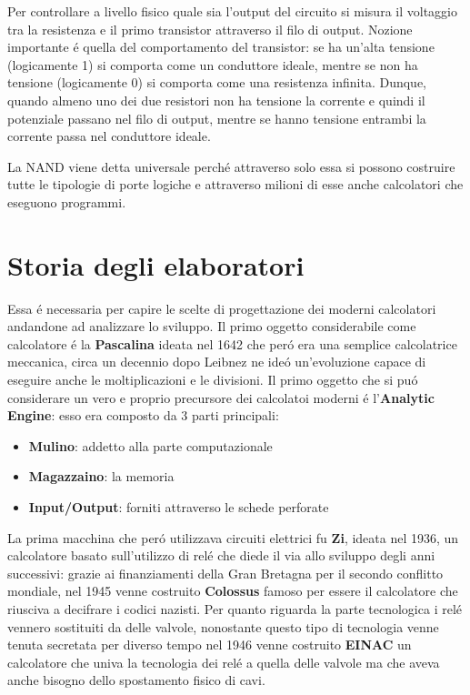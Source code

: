 \documentclass{article}
\begin{document}
Per controllare a livello fisico quale sia l'output del circuito si misura il voltaggio tra la resistenza e il primo transistor attraverso il filo di output. Nozione importante é quella del comportamento del transistor: se ha un'alta tensione (logicamente 1) si comporta come un conduttore ideale, mentre se non ha tensione (logicamente 0) si comporta come una resistenza infinita. Dunque, quando almeno uno dei due resistori non ha tensione la corrente e quindi il potenziale passano nel filo di output, mentre se hanno tensione entrambi la corrente passa nel conduttore ideale.


La NAND viene detta universale perché attraverso solo essa si possono costruire tutte le tipologie di porte logiche e attraverso milioni di esse anche calcolatori che eseguono programmi.


\section{Storia degli elaboratori}
Essa é necessaria per capire le scelte di progettazione dei moderni calcolatori andandone ad analizzare lo sviluppo. Il primo oggetto considerabile come calcolatore é la \textbf{Pascalina} ideata nel 1642 che peró era una semplice calcolatrice meccanica, circa un decennio dopo Leibnez ne ideó un'evoluzione capace di eseguire anche le moltiplicazioni e le divisioni. Il primo oggetto che si puó considerare un vero e proprio precursore dei calcolatoi moderni é l'\textbf{Analytic Engine}: esso era composto da 3 parti principali:
\begin{itemize}
    \item \textbf{Mulino}: addetto alla parte computazionale
    \item \textbf{Magazzaino}: la memoria
    \item \textbf{Input/Output}: forniti attraverso le schede perforate
\end{itemize}
La prima macchina che peró utilizzava circuiti elettrici fu \textbf{Zi}, ideata nel 1936, un calcolatore basato sull'utilizzo di relé che diede il via allo sviluppo degli anni successivi: grazie ai finanziamenti della Gran Bretagna per il secondo conflitto mondiale, nel 1945 venne costruito \textbf{Colossus} famoso per essere il calcolatore che riusciva a decifrare i codici nazisti. Per quanto riguarda la parte tecnologica i relé vennero sostituiti da delle valvole, nonostante questo tipo di tecnologia venne tenuta secretata per diverso tempo nel 1946 venne costruito \textbf{EINAC} un calcolatore che univa la tecnologia dei relé a quella delle valvole ma che aveva anche bisogno dello spostamento fisico di cavi.
\end{document}
